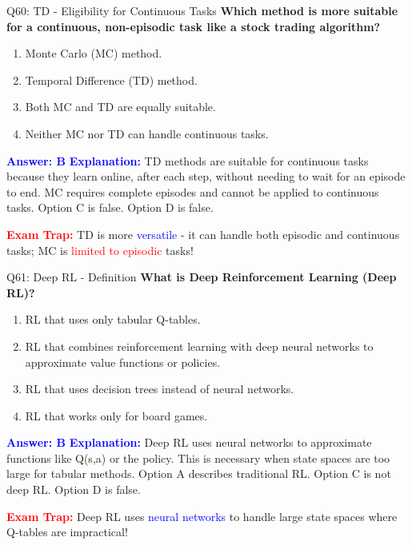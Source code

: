 \documentclass[8pt]{beamer}
\begin{document}
	\begin{frame}{Q60: TD - Eligibility for Continuous Tasks}
		\fontsize{6.5}{7.5}\selectfont
		\textbf{Which method is more suitable for a continuous, non-episodic task like a stock trading algorithm?}
		
		\begin{enumerate}
			\item Monte Carlo (MC) method.
			\item Temporal Difference (TD) method.
			\item Both MC and TD are equally suitable.
			\item Neither MC nor TD can handle continuous tasks.
		\end{enumerate}
		
		\vspace{0.1cm}
		\textcolor{blue}{\textbf{Answer: B}}
		\vspace{0.1cm}
		\textcolor{blue}{\textbf{Explanation:}} TD methods are suitable for continuous tasks because they learn online, after each step, without needing to wait for an episode to end. MC requires complete episodes and cannot be applied to continuous tasks. Option C is false. Option D is false.
		
		\textcolor{red}{\textbf{Exam Trap:}} TD is more \textcolor{blue}{versatile} - it can handle both episodic and continuous tasks; MC is \textcolor{red}{limited to episodic} tasks!
	\end{frame}
	
	
	\begin{frame}{Q61: Deep RL - Definition}
		\fontsize{6.5}{7.5}\selectfont
		\textbf{What is Deep Reinforcement Learning (Deep RL)?}
		
		\begin{enumerate}
			\item RL that uses only tabular Q-tables.
			\item RL that combines reinforcement learning with deep neural networks to approximate value functions or policies.
			\item RL that uses decision trees instead of neural networks.
			\item RL that works only for board games.
		\end{enumerate}
		
		\vspace{0.1cm}
		\textcolor{blue}{\textbf{Answer: B}}
		\vspace{0.1cm}
		\textcolor{blue}{\textbf{Explanation:}} Deep RL uses neural networks to approximate functions like Q(s,a) or the policy. This is necessary when state spaces are too large for tabular methods. Option A describes traditional RL. Option C is not deep RL. Option D is false.
		
		\textcolor{red}{\textbf{Exam Trap:}} Deep RL uses \textcolor{blue}{neural networks} to handle large state spaces where Q-tables are impractical!
	\end{frame}
	
\end{document}

